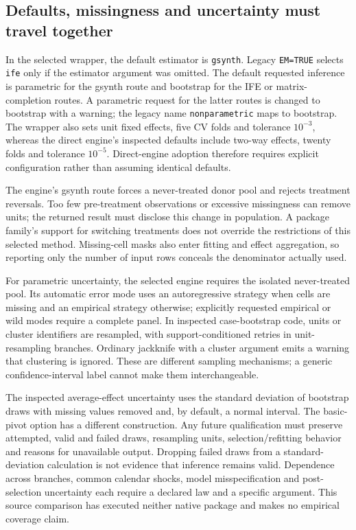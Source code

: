 \subsection{Defaults, missingness and uncertainty must travel together}
\label{exec21:gsynth-inference}

In the selected wrapper, the default estimator is \texttt{gsynth}. Legacy
\texttt{EM=TRUE} selects \texttt{ife} only if the estimator argument was
omitted. The default requested inference is parametric for the gsynth route
and bootstrap for the IFE or matrix-completion routes. A parametric request
for the latter routes is changed to bootstrap with a warning; the legacy
name \texttt{nonparametric} maps to bootstrap. The wrapper also sets unit
fixed effects, five CV folds and tolerance $10^{-3}$, whereas the direct
engine's inspected defaults include two-way effects, twenty folds and
tolerance $10^{-5}$. Direct-engine adoption therefore requires explicit
configuration rather than assuming identical defaults.
\cite{exec21_gsynth_wrapper,exec21_gsynth_engine}

The engine's gsynth route forces a never-treated donor pool and rejects
treatment reversals. Too few pre-treatment observations or excessive
missingness can remove units; the returned result must disclose this change
in population. A package family's support for switching treatments does not
override the restrictions of this selected method. Missing-cell masks also
enter fitting and effect aggregation, so reporting only the number of
input rows conceals the denominator actually used. \cite{exec21_gsynth_engine}

For parametric uncertainty, the selected engine requires the isolated
never-treated pool. Its automatic error mode uses an autoregressive strategy
when cells are missing and an empirical strategy otherwise; explicitly
requested empirical or wild modes require a complete panel. In inspected
case-bootstrap code, units or cluster identifiers are resampled, with
support-conditioned retries in unit-resampling branches. Ordinary jackknife
with a cluster argument emits a warning that clustering is ignored. These
are different sampling mechanisms; a generic confidence-interval label
cannot make them interchangeable. \cite{exec21_gsynth_engine}

The inspected average-effect uncertainty uses the standard deviation of
bootstrap draws with missing values removed and, by default, a normal
interval. The basic-pivot option has a different construction. Any future
qualification must preserve attempted, valid and failed draws, resampling
units, selection/refitting behavior and reasons for unavailable output.
Dropping failed draws from a standard-deviation calculation is not evidence
that inference remains valid. Dependence across branches, common calendar
shocks, model misspecification and post-selection uncertainty each require a
declared law and a specific argument. This source comparison has executed
neither native package and makes no empirical coverage claim.
\cite{exec21_gsynth_engine}

